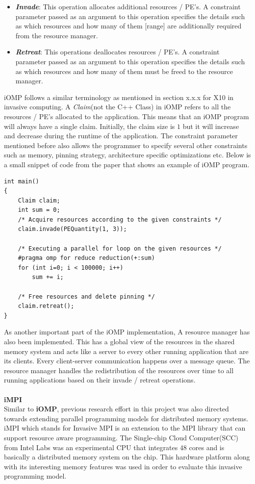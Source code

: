 \begin{itemize}
\item \textbf{\textit{Invade}}: This operation allocates additional resources / PE's. A constraint parameter passed as an argument to this operation specifies the details such as which resources and how many of them [range] are additionally required from the resource manager.
\item \textbf{\textit{Retreat}}: This operations deallocates resources / PE's. A constraint parameter passed as an argument to this operation specifies the details such as which resources and how many of them must be freed to the resource manager.
\end{itemize}
iOMP follows a similar terminology as mentioned in section x.x.x for X10 in invasive computing. A \textit{Claim}(not the C++ Class) in iOMP refers to all the resources / PE's allocated to the application. This means that an iOMP program will always have a single claim. Initially, the claim size is $1$ but it will increase and decrease during the runtime of the application. The constraint parameter mentioned before also allows the programmer to specify several other constraints such as memory, pinning strategy, architecture specific optimizations etc. Below is a small snippet of code from the paper that shows an example of iOMP program.
\begin{lstlisting}[frame=single]
int main() 
{
	Claim claim;
	int sum = 0;
	/* Acquire resources according to the given constraints */
	claim.invade(PEQuantity(1, 3));
	
	/* Executing a parallel for loop on the given resources */
	#pragma omp for reduce reduction(+:sum)
	for (int i=0; i < 100000; i++)
		sum += i;
	
	/* Free resources and delete pinning */
	claim.retreat();
}		
\end{lstlisting}
As another important part of the iOMP implementation,  A resource manager has also been implemented. This has a global view of the resources in the shared memory system and acts like a server to every other running application that are its clients. Every client-server communication happens over a message queue. The resource manager handles the redistribution of the resources over time to all running applications based on their invade / retreat operations.\\ \\
\textbf{iMPI}\\
Similar to \textbf{iOMP}, previous research effort in this project was also directed towards extending parallel programming models for distributed memory systems. iMPI which stands for Invasive MPI is an extension to the MPI library that can support resource aware programming. The Single-chip Cloud Computer(SCC) from Intel Labs was an experimental CPU that integrates 48 cores and is basically a distributed memory system on the chip. This hardware platform along with its interesting memory features was used in order to evaluate this invasive programming model.\\ \\

